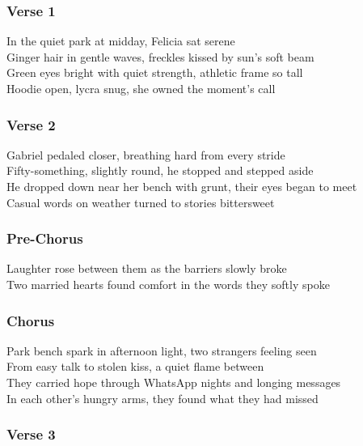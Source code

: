 \subsubsection{Verse 1}\label{verse-1-28}

In the quiet park at midday, Felicia sat serene\\
Ginger hair in gentle waves, freckles kissed by sun's soft beam\\
Green eyes bright with quiet strength, athletic frame so tall\\
Hoodie open, lycra snug, she owned the moment's call

\subsubsection{Verse 2}\label{verse-2-28}

Gabriel pedaled closer, breathing hard from every stride\\
Fifty-something, slightly round, he stopped and stepped aside\\
He dropped down near her bench with grunt, their eyes began to meet\\
Casual words on weather turned to stories bittersweet

\subsubsection{Pre-Chorus}\label{pre-chorus-49}

Laughter rose between them as the barriers slowly broke\\
Two married hearts found comfort in the words they softly spoke

\subsubsection{Chorus}\label{chorus-73}

Park bench spark in afternoon light, two strangers feeling seen\\
From easy talk to stolen kiss, a quiet flame between\\
They carried hope through WhatsApp nights and longing messages\\
In each other's hungry arms, they found what they had missed

\subsubsection{Verse 3}\label{verse-3-14}

